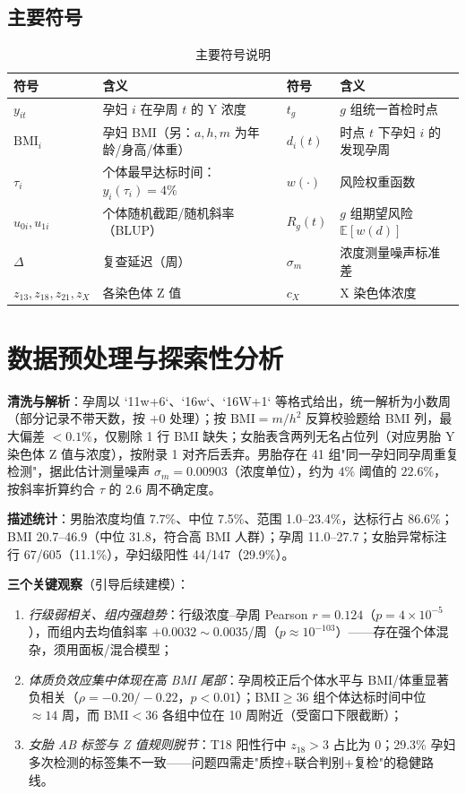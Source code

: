 \documentclass[11pt,a4paper]{ctexart}
\newcommand{\E}{\mathbb{E}}
\begin{document}
\subsection{主要符号}
\begin{table}[H]
\centering\small
\caption{主要符号说明}
\begin{tabular}{llll}
\toprule
符号 & 含义 & 符号 & 含义\\
\midrule
$y_{it}$ & 孕妇 $i$ 在孕周 $t$ 的 Y 浓度 & $t_g$ & $g$ 组统一首检时点\\
$\mathrm{BMI}_i$ & 孕妇 BMI（另：$a,h,m$ 为年龄/身高/体重） & $d_i(t)$ & 时点 $t$ 下孕妇 $i$ 的发现孕周\\
$\tau_i$ & 个体最早达标时间：$y_i(\tau_i)=4\%$ & $w(\cdot)$ & 风险权重函数\\
$u_{0i},u_{1i}$ & 个体随机截距/随机斜率（BLUP） & $R_g(t)$ & $g$ 组期望风险 $\E[w(d)]$\\
$\Delta$ & 复查延迟（周） & $\sigma_m$ & 浓度测量噪声标准差\\
$z_{13},z_{18},z_{21},z_X$ & 各染色体 Z 值 & $c_X$ & X 染色体浓度\\
\bottomrule
\end{tabular}
\end{table}

\section{数据预处理与探索性分析}
\textbf{清洗与解析}：孕周以 `11w+6`、`16w`、`16W+1` 等格式给出，统一解析为小数周（部分记录不带天数，按 $+0$ 处理）；按 $\mathrm{BMI}=m/h^2$ 反算校验题给 BMI 列，最大偏差 $<0.1\%$，仅剔除 1 行 BMI 缺失；女胎表含两列无名占位列（对应男胎 Y 染色体 Z 值与浓度），按附录 1 对齐后丢弃。男胎存在 41 组"同一孕妇同孕周重复检测"，据此估计测量噪声 $\sigma_m=0.00903$（浓度单位），约为 $4\%$ 阈值的 $22.6\%$，按斜率折算约合 $\tau$ 的 $2.6$ 周不确定度。

\textbf{描述统计}：男胎浓度均值 7.7\%、中位 7.5\%、范围 1.0--23.4\%，达标行占 86.6\%；BMI 20.7--46.9（中位 31.8，符合高 BMI 人群）；孕周 11.0--27.7；女胎异常标注行 67/605（11.1\%），孕妇级阳性 44/147（29.9\%）。

\textbf{三个关键观察}（引导后续建模）：
\begin{enumerate}
\item \emph{行级弱相关、组内强趋势}：行级浓度--孕周 Pearson $r=0.124$（$p=4\times10^{-5}$），而组内去均值斜率 $+0.0032\sim0.0035$/周（$p\approx10^{-103}$）——存在强个体混杂，须用面板/混合模型；
\item \emph{体质负效应集中体现在高 BMI 尾部}：孕周校正后个体水平与 BMI/体重显著负相关（$\rho=-0.20/-0.22$，$p<0.01$）；BMI$\ge36$ 组个体达标时间中位 $\approx14$ 周，而 BMI$<36$ 各组中位在 10 周附近（受窗口下限截断）；
\item \emph{女胎 AB 标签与 Z 值规则脱节}：T18 阳性行中 $z_{18}>3$ 占比为 0；29.3\% 孕妇多次检测的标签集不一致——问题四需走"质控+联合判别+复检"的稳健路线。
\end{enumerate}
\end{document}
